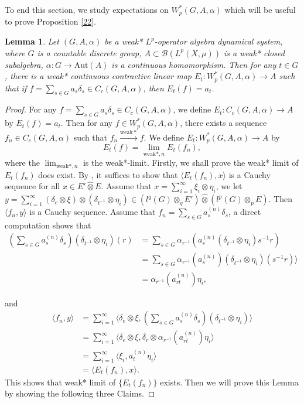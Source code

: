 \documentclass[reqno,11pt]{amsart}
\theoremstyle{plain}
\newtheorem{lem}[thm]{Lemma}
\theoremstyle{definition}
\theoremstyle{remark}
\newcommand{\la}{\langle}
\newcommand{\ra}{\rangle}
\begin{document}
To end this section, we study  expectations on $W^*_p(G,A,\alpha)$ which will be useful to prove Proposition \ref{22}.
\begin{lem}\label{exp}
Let $(G,A,\alpha)$ be a weak* $L^p$-operator algebra dynamical system, where $G$ is a countable discrete group, $A\subset \mathcal{B}(L^p(X,\mu))$ is a weak* closed subalgebra, $\alpha:G\rightarrow \mathrm{Aut}(A)$ is a continuous homomorphism. Then for any $t\in G$, there is a weak* continuous contractive linear map $E_t:W^*_p(G,A,\alpha)\rightarrow A$ such that if $f=\sum_{s\in G} a_s\delta_s\in C_c(G,A,\alpha)$, then $E_t(f)=a_t$.
\end{lem}
\begin{proof}
For any $f=\sum_{s\in G} a_s\delta_s\in C_c(G,A,\alpha)$, we define $E_t:C_c(G,A,\alpha)\rightarrow A$ by $E_t(f)=a_t$. Then for any $f\in W^*_p(G,A,\alpha)$, there exists a sequence $f_n\in C_c(G,A,\alpha)$ such that $f_n\xrightarrow{\mathrm{weak}*}f$. We define $E_t:W^*_p(G,A,\alpha)\rightarrow A$ by $$E_t(f)=\lim_{\mathrm{weak}*,n} E_t(f_n),$$ where the $\lim_{\mathrm{weak}*,n}$ is the weak*-limit. Firstly, we shall prove the weak* limit of $E_t(f_n)$ does exist.
By \cite[Exercise 1.35]{Douglas}, it suffices to show that $\la E_t(f_n),x\ra$ is a Cauchy sequence for all $x\in E'\widehat{\otimes}E$. Assume that $x=\sum_{i=1}^\infty \xi_i\otimes\eta_i$, we let $y=\sum_{i=1}^\infty(\delta_e\otimes\xi)\otimes(\delta_{t^{-1}}\otimes\eta_i)\in (l^q(G)\otimes_q E')\widehat{\otimes}(l^p(G)\otimes_p E)$. Then $\la f_n,y\ra$ is a Cauchy sequence. Assume that $f_n=\sum_{s\in G}a_s^{(n)}\delta_s$, a direct computation shows that
$$\begin{aligned} (\sum_{s\in G}a_s^{(n)}\delta_s)(\delta_{t^{-1}}\otimes\eta_i)(r)
 &=\sum_{s\in G}\alpha_{r^{-1}}(a_s^{(n)}(\delta_{t^{-1}}\otimes\eta_i)s^{-1}r)\\
 &=\sum_{s\in G} \alpha_{r^{-1}}(a_s^{(n)}) (\delta_{t^{-1}}\otimes \eta_i)(s^{-1}r)  \ra\\
 &=\alpha_{r^{-1}}(a_{rt}^{(n)})\eta_i,\end{aligned}$$

and
$$\begin{aligned} \la f_n,y\ra
 &=\sum_{i=1}^\infty\la \delta_e\otimes\xi,(\sum_{s\in G}a_s^{(n)}\delta_s)(\delta_{t^{-1}}\otimes\eta_i)\ra\\
 &=\sum_{i=1}^\infty \la \delta_e\otimes\xi, \delta_r\otimes \alpha_{r^{-1}}(a_{rt}^{(n)})\eta_i\ra \\
 &=\sum_{i=1}^\infty\la \xi_i,a_t^{(n)}\eta_i\ra\\
 &=\la E_t(f_n),x\ra.\end{aligned}$$
This shows that  weak* limit of $\{E_t(f_n)\}$ exists.
Then we will prove this Lemma by showing the following three Claims.


\end{proof}
\end{document}
